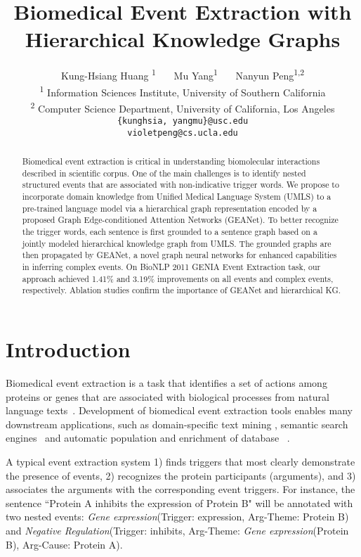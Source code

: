 \documentclass[11pt,a4paper]{article}
\title{Biomedical Event Extraction with Hierarchical Knowledge Graphs}
\author{
    Kung-Hsiang Huang \textsuperscript{\rm 1}~~~
    Mu Yang\textsuperscript{\rm 1}~~~
    Nanyun Peng\textsuperscript{\rm 1,2}\\
    \textsuperscript{\rm 1} Information Sciences Institute, University of Southern California\\
    \textsuperscript{\rm 2} Computer Science Department, University of California, Los Angeles \\
    {\tt \{kunghsia, yangmu\}@usc.edu}\\
    {\tt violetpeng@cs.ucla.edu} 
}
\date{}
\newcommand{\GAENet}{\textrm{GEANet}}
\newcommand{\GAENetFull}{Graph Edge-conditioned Attention Networks}
\begin{document}
\maketitle








\begin{abstract}

Biomedical event extraction is critical in understanding biomolecular interactions described in scientific corpus. One of the main challenges is to identify nested structured events that are associated with non-indicative trigger words. We propose to incorporate domain knowledge from Unified Medical Language System (UMLS) to a pre-trained language model via a hierarchical graph representation encoded by a proposed \GAENetFull{} (\GAENet). To better recognize the trigger words, each sentence is first grounded to a sentence graph based on a jointly modeled hierarchical knowledge graph from UMLS. The grounded graphs are then propagated by \GAENet, a novel graph neural networks for enhanced capabilities in inferring complex events. On BioNLP 2011 GENIA Event Extraction task, our approach achieved 1.41\%  and 3.19\%  improvements on all events and complex events, respectively. Ablation studies confirm the importance of \GAENet{} and hierarchical KG. 








\end{abstract} \section{Introduction}



Biomedical event extraction is a task that identifies a set of actions among proteins or genes that are associated with biological processes from natural language texts~\cite{kim-etal-2009-overview, kim2011overview}. Development of biomedical event extraction tools enables many downstream applications, such as domain-specific text mining \cite{ananiadou2015event,spangher2020enabling}, semantic search engines~\cite{miyao-etal-2006-semantic} and automatic population and enrichment of database ~\cite{hirschman2012text}. 

A typical event extraction system 1) finds triggers that most clearly demonstrate the presence of events, 2) recognizes the protein participants (arguments), and 3) associates the arguments with the corresponding event triggers. For instance, the sentence ``Protein A inhibits the expression of Protein B" will be annotated with two nested events: \textit{Gene expression}(Trigger: expression, Arg-Theme: 
Protein B) and \textit{Negative Regulation}(Trigger: inhibits, Arg-Theme: \textit{Gene expression}(Protein B), Arg-Cause: Protein A).
\end{document}
